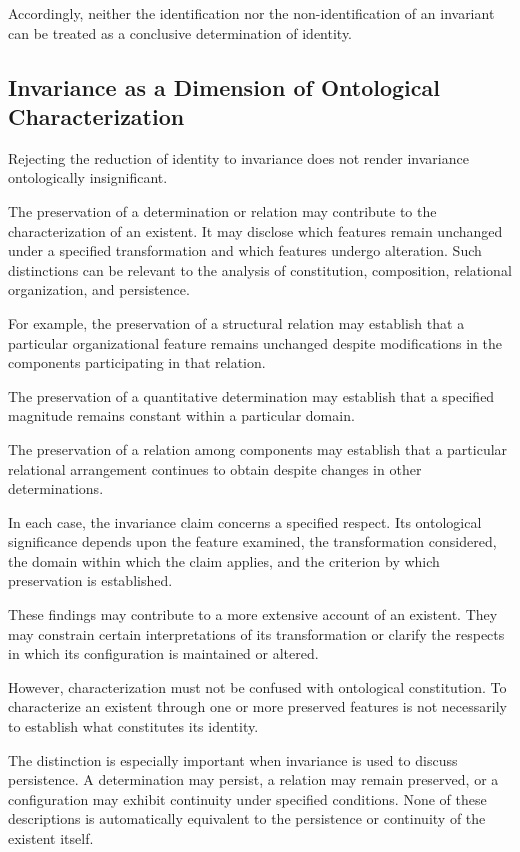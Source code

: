 Accordingly, neither the identification nor the
non-identification of an invariant can be treated
as a conclusive determination of identity.

\subsection{Invariance as a Dimension of Ontological Characterization}

Rejecting the reduction of identity to invariance
does not render invariance ontologically insignificant.

The preservation of a determination or relation
may contribute to the characterization of an
existent. It may disclose which features remain
unchanged under a specified transformation and
which features undergo alteration. Such distinctions
can be relevant to the analysis of constitution,
composition, relational organization, and persistence.

For example, the preservation of a structural
relation may establish that a particular organizational
feature remains unchanged despite modifications
in the components participating in that relation.

The preservation of a quantitative determination
may establish that a specified magnitude remains
constant within a particular domain.

The preservation of a relation among components
may establish that a particular relational arrangement
continues to obtain despite changes in other
determinations.

In each case, the invariance claim concerns a
specified respect. Its ontological significance
depends upon the feature examined, the transformation
considered, the domain within which the claim
applies, and the criterion by which preservation
is established.

These findings may contribute to a more extensive
account of an existent. They may constrain certain
interpretations of its transformation or clarify
the respects in which its configuration is maintained
or altered.

However, characterization must not be confused
with ontological constitution. To characterize
an existent through one or more preserved features
is not necessarily to establish what constitutes
its identity.

The distinction is especially important when
invariance is used to discuss persistence. A
determination may persist, a relation may remain
preserved, or a configuration may exhibit continuity
under specified conditions. None of these descriptions
is automatically equivalent to the persistence
or continuity of the existent itself.


